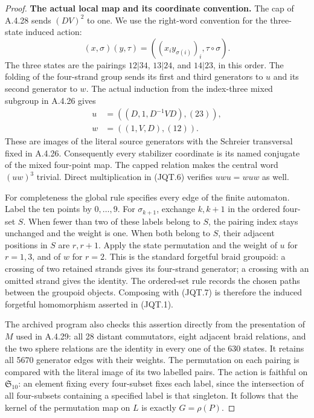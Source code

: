 \begin{proof}
\par\medskip\noindent\textbf{The actual local map and its coordinate convention.}\quad
The cap of A.4.28 sends $(DV)^2$ to one.  We use the
right-word convention for the three-state induced action:
\[
 (x,\sigma)(y,\tau)
   =((x_i y_{\sigma(i)})_i,\tau\circ\sigma).
                                                               \tag{JQT.6}
\]
The three states are the pairings $12|34$, $13|24$, and
$14|23$, in this order.  The folding of the four-strand
group sends its first and third generators to $u$ and its
second generator to $w$.  The actual induction from the
index-three mixed subgroup in A.4.26 gives
\[
\begin{aligned}
 u&=((D,1,D^{-1}VD),(23)),\\
 w&=((1,V,D),(12)).
\end{aligned}                                                  \tag{JQT.7}
\]
These are images of the literal source generators with the
Schreier transversal fixed in A.4.26.  Consequently every
stabilizer coordinate is its named conjugate of the mixed
four-point map.  The capped relation makes the central word
$(uw)^3$ trivial.  Direct multiplication in (JQT.6) verifies
$uwu=wuw$ as well.

For completeness the global rule specifies every edge of the
finite automaton.  Label the ten points by $0,\ldots,9$.
For $\sigma_{k+1}$, exchange $k,k+1$ in the ordered four-set
$S$.  When fewer than two of these labels belong to $S$,
the pairing index stays unchanged and the weight is one.
When both belong to $S$, their adjacent positions in $S$
are $r,r+1$.  Apply the state permutation and the weight
of $u$ for $r=1,3$, and of $w$ for $r=2$.
This is the standard forgetful braid groupoid: a crossing
of two retained strands gives its four-strand generator;
a crossing with an omitted strand gives the identity.
The ordered-set rule records the chosen paths between
the groupoid objects.  Composing with (JQT.7) is therefore
the induced forgetful homomorphism asserted in (JQT.1).

The archived program also checks this assertion directly
from the presentation of $M$ used in A.4.29: all 28 distant
commutators, eight adjacent braid relations, and the two
sphere relations are the identity in every one of the 630
states.  It retains all 5670 generator edges with their
weights.  The permutation on each pairing is compared with
the literal image of its two labelled pairs.  The action is
faithful on $\mathfrak S_{10}$: an element fixing every
four-subset fixes each label, since the intersection of
all four-subsets containing a specified label is that
singleton.  It follows that the kernel of the permutation
map on $L$ is exactly $G=\rho(P)$.


\end{proof}
